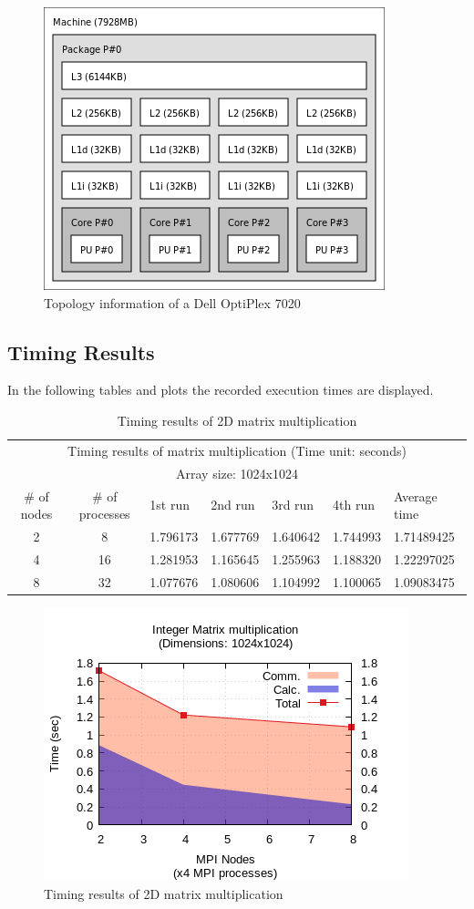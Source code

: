 \documentclass{article}
\begin{document}
\begin{figure}[htbp]
  \centering
  \includegraphics[width=0.5\columnwidth]{./opti7020-topo.png}
  \caption{Topology information of a Dell OptiPlex 7020}
\end{figure}

\newpage

\subsection{Timing Results}
In the following tables and plots the recorded execution times are displayed.


\begin{table}[htbp]
  \centering
    \begin{tabular}{|c c||l l l l| l|} 
    \hline
    \multicolumn{7}{|c|}{Timing results of matrix multiplication (Time unit: seconds)} \\
    \multicolumn{7}{|c|}{Array size: 1024x1024} \\
    \hline
    \# of nodes & \# of processes & 1st run & 2nd run & 3rd run & 4th run & Average time\\ [0.5ex] 
    \hline\hline
    2 & 8 & 1.796173 & 1.677769 & 1.640642 & 1.744993 & 1.71489425 \\ 
    \hline
    4 & 16 & 1.281953 & 1.165645 & 1.255963 & 1.188320 & 1.22297025 \\
    \hline
    8 & 32 & 1.077676 & 1.080606 & 1.104992 & 1.100065 & 1.09083475 \\ [1ex]
    \hline
    \end{tabular}
  \caption{Timing results of 2D matrix multiplication}
\end{table}


\begin{figure}[htbp]
  \centering
  \includegraphics[width=0.55\columnwidth]{../../hw3/ex1/plots/matmul.png}
  \caption{Timing results of 2D matrix multiplication}
\end{figure}
\end{document}
